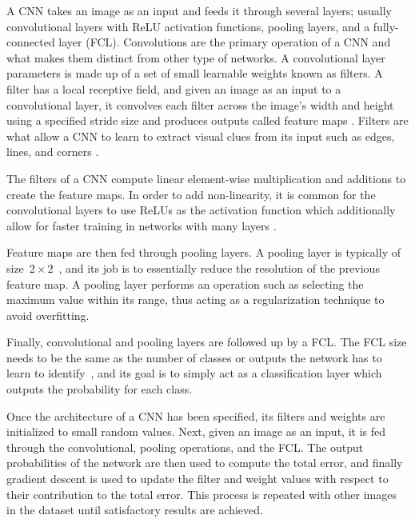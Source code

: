 A CNN takes an image as an input and feeds it through several layers; usually convolutional layers with ReLU activation functions, pooling layers, and a fully-connected layer (FCL). Convolutions are the primary operation of a CNN and what makes them distinct from other type of networks. A convolutional layer parameters is made up of a set of small learnable weights known as filters. A filter has a local receptive field, and given an image as an input to a convolutional layer, it convolves each filter across the image's width and height using a specified stride size and produces outputs called feature maps \cite{cnn-star-galaxy}. Filters are what allow a CNN to learn to extract visual clues from its input such as edges, lines, and corners \cite{Lecun99objectrecognition}.

The filters of a CNN compute linear element-wise multiplication and additions to create the feature maps. In order to add non-linearity, it is common for the convolutional layers to use ReLUs as the activation function which additionally allow for faster training in networks with many layers \cite{cnn-star-galaxy}.

Feature maps are then fed through pooling layers. A pooling layer is typically of size~$2 \times 2$~\cite{NIPS2012_4824}, and  its job is to essentially reduce the resolution of the previous feature map. A pooling layer performs an operation such as selecting the maximum value within its range, thus acting as a regularization technique to avoid overfitting.

Finally, convolutional and pooling layers are followed up by a FCL. The FCL size needs to be the same as the number of classes or outputs the network has to learn to identify~\cite{Ciresan11flexible}, and its goal is to simply act as a classification layer which outputs the probability for each class.

Once the architecture of a CNN has been specified, its filters and weights are initialized to small random values. Next, given an image as an input, it is fed through the convolutional, pooling operations, and the FCL. The output probabilities of the network are then used to compute the total error, and finally gradient descent is used to update the filter and weight values with respect to their contribution to the total error. This process is repeated with other images in the dataset until satisfactory results are achieved.

